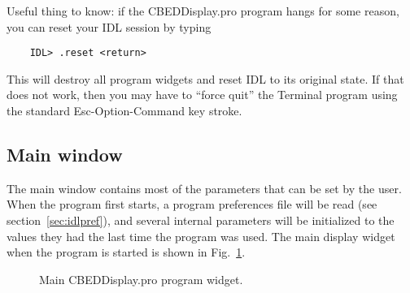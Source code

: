 \documentclass[DIV=calc, paper=letter, fontsize=11pt]{scrartcl}	 %
\begin{document}
Useful thing to know: if the \textsf{CBEDDisplay.pro}  program hangs for some reason, you can reset your IDL session by typing
\begin{verbatim}
	IDL> .reset <return>
\end{verbatim}
This will destroy all program widgets and reset IDL to its original state.  If that does not work, then you may have to ``force quit'' the Terminal program
using the standard Esc-Option-Command key stroke.


\subsection{Main window\label{sec:idlmain}}
The main window contains most of the parameters that can be set by the user.  When the program first starts, a program preferences file 
will be read (see section~\ref{sec:idlpref}), and several internal parameters will be initialized to the values they had the last time the program
was used.  The main display widget when the program is started is shown in Fig.~\ref{fig:widget1}.

\begin{figure}[h]
\leavevmode\centering
{}
\caption{\label{fig:widget1}Main \textsf{CBEDDisplay.pro} program widget.}
\end{figure}
\end{document}
